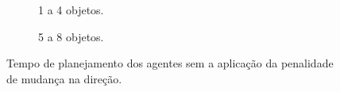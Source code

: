 \begin{figure}[h]
  \centering
  \setlength{\fboxsep}{0pt}

  \begin{subfigure}[t]{0.49\textwidth}
    \centering
    \caption{1 a 4 objetos.}
  \end{subfigure}
  \begin{subfigure}[t]{0.49\textwidth}
    \centering
    \caption{5 a 8 objetos.}
  \end{subfigure}
  \caption{Tempo de planejamento dos agentes sem a aplicação da penalidade de mudança na direção.}
  \label{fig:ambiente_penalizacao_tempo_sem}
\end{figure}

